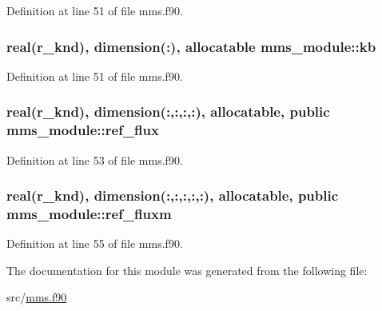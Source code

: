 Definition at line 51 of file mms.\-f90.

\hypertarget{classmms__module_a634bb1d1d1405007f6bec01e8b6d9b85}{
\subsubsection[{kb}]{\setlength{\rightskip}{0pt plus 5cm}real(r\-\_\-knd), dimension(\-:), allocatable mms\-\_\-module\-::kb\hspace{0.3cm}{\ttfamily [private]}}}\label{classmms__module_a634bb1d1d1405007f6bec01e8b6d9b85}


Definition at line 51 of file mms.\-f90.

\hypertarget{classmms__module_a20157f9a49b1c0b449c340b7b1a63791}{
\subsubsection[{ref\-\_\-flux}]{\setlength{\rightskip}{0pt plus 5cm}real(r\-\_\-knd), dimension(\-:,\-:,\-:,\-:), allocatable, public mms\-\_\-module\-::ref\-\_\-flux}}\label{classmms__module_a20157f9a49b1c0b449c340b7b1a63791}


Definition at line 53 of file mms.\-f90.

\hypertarget{classmms__module_aaa592b5b9f1591e2a34df390563b0c56}{
\subsubsection[{ref\-\_\-fluxm}]{\setlength{\rightskip}{0pt plus 5cm}real(r\-\_\-knd), dimension(\-:,\-:,\-:,\-:,\-:), allocatable, public mms\-\_\-module\-::ref\-\_\-fluxm}}\label{classmms__module_aaa592b5b9f1591e2a34df390563b0c56}


Definition at line 55 of file mms.\-f90.



The documentation for this module was generated from the following file\-:\begin{DoxyCompactItemize}
\item 
src/\hyperlink{mms_8f90}{mms.\-f90}\end{DoxyCompactItemize}
